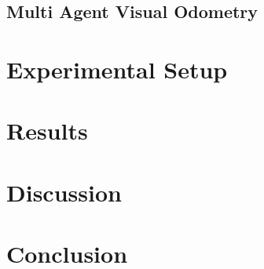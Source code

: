 \documentclass[a4paper]{article}
\begin{document}
\subsection{Multi Agent Visual Odometry}


\section{Experimental Setup}

\section{Results}

\section{Discussion}

\section{Conclusion}



\end{document}
